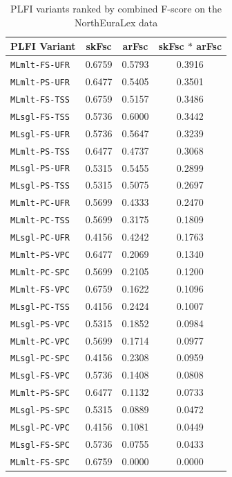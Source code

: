 \begin{table}
 \centering
 \begin{tabular}{lccc}
 \hline \hline
PLFI Variant & skFsc & arFsc & skFsc $\ast$ arFsc\\ \hline
\texttt{MLmlt-FS-UFR} & 0.6759 & 0.5793 & 0.3916\\
\texttt{MLmlt-PS-UFR} & 0.6477 & 0.5405 & 0.3501\\
\texttt{MLmlt-FS-TSS} & 0.6759 & 0.5157 & 0.3486\\
\texttt{MLsgl-FS-TSS} & 0.5736 & 0.6000 & 0.3442\\
\texttt{MLsgl-FS-UFR} & 0.5736 & 0.5647 & 0.3239\\
\texttt{MLmlt-PS-TSS} & 0.6477 & 0.4737 & 0.3068\\
\texttt{MLsgl-PS-UFR} & 0.5315 & 0.5455 & 0.2899\\
\texttt{MLsgl-PS-TSS} & 0.5315 & 0.5075 & 0.2697\\
\texttt{MLmlt-PC-UFR} & 0.5699 & 0.4333 & 0.2470\\
\texttt{MLmlt-PC-TSS} & 0.5699 & 0.3175 & 0.1809\\
\texttt{MLsgl-PC-UFR} & 0.4156 & 0.4242 & 0.1763\\
\texttt{MLmlt-PS-VPC} & 0.6477 & 0.2069 & 0.1340\\
\texttt{MLmlt-PC-SPC} & 0.5699 & 0.2105 & 0.1200\\
\texttt{MLmlt-FS-VPC} & 0.6759 & 0.1622 & 0.1096\\
\texttt{MLsgl-PC-TSS} & 0.4156 & 0.2424 & 0.1007\\
\texttt{MLsgl-PS-VPC} & 0.5315 & 0.1852 & 0.0984\\
\texttt{MLmlt-PC-VPC} & 0.5699 & 0.1714 & 0.0977\\
\texttt{MLsgl-PC-SPC} & 0.4156 & 0.2308 & 0.0959\\
\texttt{MLsgl-FS-VPC} & 0.5736 & 0.1408 & 0.0808\\
\texttt{MLmlt-PS-SPC} & 0.6477 & 0.1132 & 0.0733\\
\texttt{MLsgl-PS-SPC} & 0.5315 & 0.0889 & 0.0472\\
\texttt{MLsgl-PC-VPC} & 0.4156 & 0.1081 & 0.0449\\
\texttt{MLsgl-FS-SPC} & 0.5736 & 0.0755 & 0.0433\\
\texttt{MLmlt-FS-SPC} & 0.6759 & 0.0000 & 0.0000\\
  \hline
 \end{tabular}
 \caption{PLFI variants ranked by combined F-score on the NorthEuraLex data}
 \label{variant-comparison-nelex}
\end{table}


